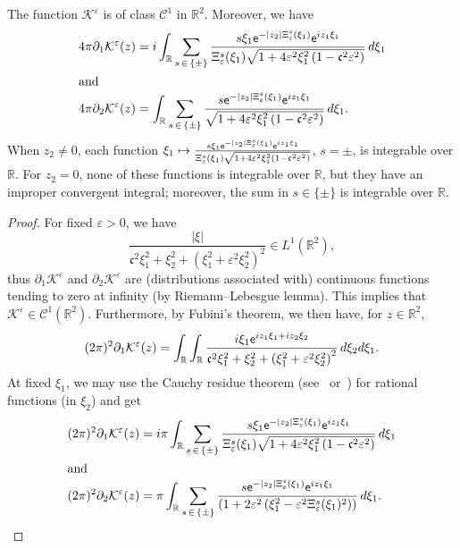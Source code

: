 \documentclass[AHL,Unicode,longabstracts,published]{cedram}
\newcommand*\p{\partial}
\newcommand*\R{\mathbb R}
\newcommand*\BC{\mathcal{C}}
\newcommand*\BK{\mathcal{K}}
\newcommand*\ex{{\sf e}}
\newcommand*\cs{{\mathfrak c}}
\newcommand*\e{\varepsilon}
\begin{document}
\begin{prop}\label{pepin_1}
The function $ \BK^\e $ is of class $ \BC^1 $ in $ \R^2 $. Moreover, we have
\begin{align*}
4 \pi \p_1 \BK^\e (z) &= i
\int_{\R} \sum_{s\,\in\,\{ \pm \} } \frac{ s \xi_1 \ex^{- |z_2| \Xi_\e^s (\xi_1)} \ex^{i z_1 \xi_1} }{\Xi_\e^s (\xi_1)
\sqrt{1 + 4\e^2 \xi_1^2 \left(1 - \cs^2 \e^2\right)}} \, d\xi_1
\\
\intertext{and}
4 \pi \p_2 \BK^\e (z) &=
\int_{\R} \sum_{s\,\in\,\{ \pm \} } \frac{ s \ex^{- |z_2| \Xi_\e^s (\xi_1)} \ex^{i z_1 \xi_1} }{ \sqrt{1 + 4\e^2 \xi_1^2 \left(1 - \cs^2 \e^2\right) } } \, d\xi_1.
\end{align*}
When $ z_2 \neq 0 $, each function $ \xi_1 \mapsto \frac{ s \xi_1 \ex^{- |z_2| \Xi_\e^s (\xi_1)} \ex^{i z_1 \xi_1} }{\Xi_\e^s (\xi_1)
\sqrt{1 + 4\e^2 \xi_1^2 (1 - \cs^2 \e^2) } } $, $ s = \pm $, is integrable over $ \R $. For $ z_2 = 0 $, none of these functions is integrable over $ \R $, but they have an improper convergent integral; moreover, the sum in $s \in \{ \pm \} $ is integrable over $\R $.
\end{prop}

\begin{proof}
For fixed $ \e> 0 $, we have
\[
\frac{ \lvert \xi \rvert}{ \cs^2 \xi_1^2 + \xi_2^2 + (\xi_1^2 + \e^2 \xi_2^2)^2 }
\in L^1 (\R^2),
\]
thus $ \p_1 \BK^\e $ and $ \p_2 \BK^\e $ are (distributions associated with) continuous functions tending to zero at infinity (by Riemann--Lebesgue lemma). This implies that $ \BK^\e \in \BC^1 (\R^2) $. Furthermore, by Fubini's theorem, we then have, for $z \in \R^2 $,
\[
(2\pi)^2 \p_1 \BK^\e (z) = \int_\R \int_\R \frac{ i \xi_1 \ex^{i z_1 \xi_1 + i z_2 \xi_2} }{ \cs^2 \xi_1^2 + \xi_2^2 + \left(\xi_1^2 + \e^2 \xi_2^2\right)^2 } \, d\xi_2 d\xi_1.
\]
At fixed $ \xi_1 $, we may use the Cauchy residue theorem (see~\cite[Chap.~VI, \S~2, Theorem~2.2 p.~194]{Lang} or~\cite[Chap. 9, Theorem~9.1 p.~154]{Howie}) for rational functions (in $ \xi_2 $) and get
\begin{align*}
(2\pi)^2 \p_1 \BK^\e (z) &= i \pi \int_{\R} \sum_{s\,\in\,\{ \pm \} } \frac{ s \xi_1 \ex^{- |z_2| \Xi_\e^s (\xi_1)} \ex^{i z_1 \xi_1} }{\Xi_\e^s (\xi_1) \sqrt{1 + 4\e^2 \xi_1^2\left(1 - \cs^2 \e^2\right) } } \, d\xi_1
\\
\intertext{and}
(2\pi)^2 \p_2 \BK^\e (z) &= \pi
\int_{\R} \sum_{s\,\in\,\{ \pm \} } \frac{ s \ex^{- |z_2| \Xi_\e^s (\xi_1)} \ex^{i z_1 \xi_1} }{\left(1 + 2\e^2 \left(\xi_1^2 - \e^2 \Xi_\e^s (\xi_1)^2\right)\right)} \, d\xi_1.\qedhere
\end{align*}
\end{proof}
\end{document}
